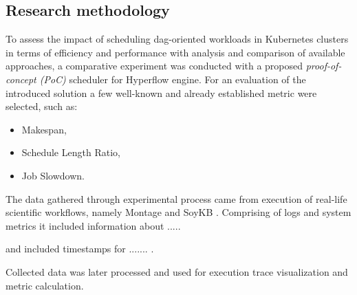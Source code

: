 \subsection{Research methodology}\label{s:Introduction:Methodology}


To assess the impact of scheduling dag-oriented workloads in Kubernetes clusters in terms of efficiency and performance
with analysis and comparison of available approaches,
a comparative experiment was conducted with a proposed \emph{proof-of-concept (PoC)} scheduler for Hyperflow engine.
For an evaluation of the introduced solution a few well-known and already established metric were selected, such as:

\begin{itemize}
  \item Makespan,
  \item Schedule Length Ratio,
  \item Job Slowdown.
\end{itemize}

The data gathered through experimental process came from execution of real-life scientific workflows,
namely Montage \cite{b:Montage} and SoyKB \cite{b:SoyKB-workflow-url}. %
Comprising of logs and system metrics it included information about ..... 

and included timestamps for ....... .

Collected data was later processed and used for execution trace visualization and metric calculation.